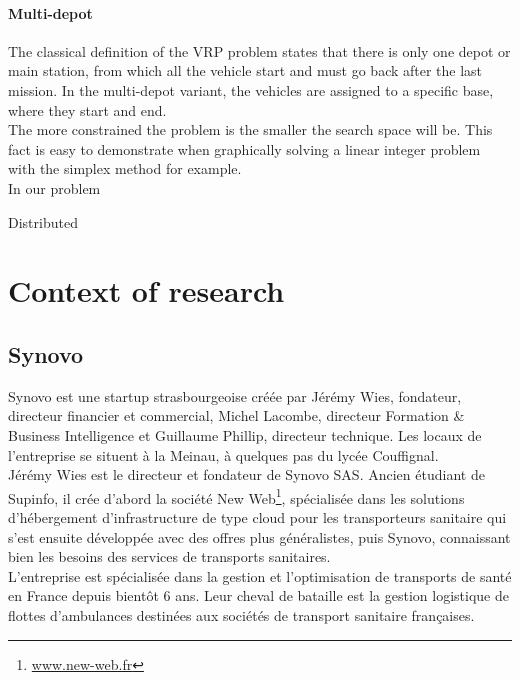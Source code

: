 \documentclass[12pt]{memoir}
\begin{document}
\paragraph{Multi-depot} %
\label{par:Multi-depot}
The classical definition of the VRP problem states that there is only one depot or
main station, from which all the vehicle start and must go back after the last
mission. In the multi-depot variant, the vehicles are assigned to a specific base,
where they start and end.\\

The more constrained the problem is the smaller the search space will be. This fact
is easy to demonstrate when graphically solving a linear integer problem with the
simplex method for example.\\
In our problem

Distributed 

\section{Context of research}
\subsection{Synovo} %

Synovo est une startup strasbourgeoise créée par Jérémy Wies, fondateur,
directeur financier et commercial, Michel Lacombe, directeur Formation
\& Business Intelligence et Guillaume Phillip, directeur technique. Les
locaux de l'entreprise se situent à la Meinau, à quelques pas du lycée
Couffignal. \\ 
Jérémy Wies est le directeur et fondateur de Synovo SAS. Ancien étudiant
de Supinfo, il crée d'abord la société New Web\footnote{\url{www.new-web.fr}}, spécialisée dans les
solutions d'hébergement d'infrastructure de type cloud pour les
transporteurs sanitaire qui s'est ensuite développée avec des offres plus
généralistes, puis Synovo, connaissant bien les besoins des services de
transports sanitaires. \\
L'entreprise est spécialisée dans la gestion et l'optimisation de
transports de santé en France depuis bientôt 6 ans. Leur cheval de
bataille est la gestion logistique de flottes d'ambulances destinées aux
sociétés de transport sanitaire françaises.
\end{document}

